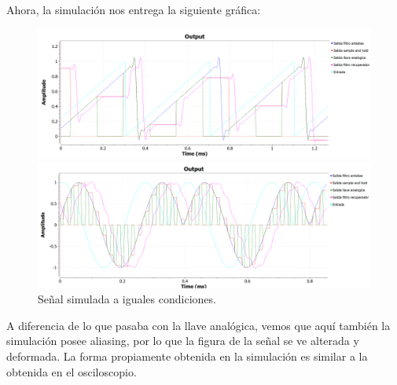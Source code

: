 \documentclass[../../ASSD_TP1_G7.tex]{subfiles}
\begin{document}
Ahora, la simulación nos entrega la siguiente gráfica:

\begin{figure}[H]

\begin{centering}
\includegraphics[scale=0.5]{Imagenes/simulacion_syh_diente_d.PNG}
\par\end{centering}
\begin{centering}
\includegraphics[scale=0.5]{Imagenes/simulacion_syh_senoraro_d.PNG}\caption{Señal simulada a iguales condiciones.}
\par\end{centering}
\end{figure}

A diferencia de lo que pasaba con la llave analógica, vemos que aquí
también la simulación posee aliasing, por lo que la figura de la señal
se ve alterada y deformada. La forma propiamente obtenida en la simulación
es similar a la obtenida en el osciloscopio.
\end{document}

